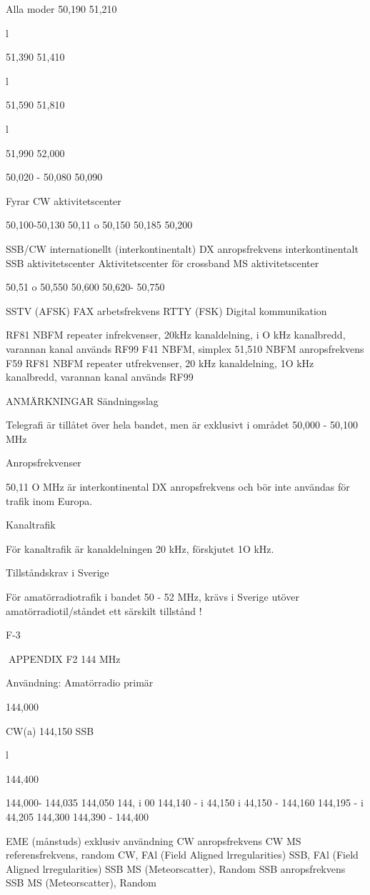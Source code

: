 \documentclass[a4paper,twoside,twocolumn,openright]{book}
\begin{document}
{{{{{{{{{{{Alla moder
50,190
51,210

l

51,390
51,410

l

51,590
51,810

l

51,990
52,000

50,020 - 50,080
50,090

Fyrar
CW aktivitetscenter

50,100-50,130
50,11 o
50,150
50,185
50,200

SSB/CW internationellt (interkontinentalt)
DX anropsfrekvens interkontinentalt
SSB aktivitetscenter
Aktivitetscenter för crossband
MS aktivitetscenter

50,51 o
50,550
50,600
50,620- 50,750

SSTV (AFSK)
FAX arbetsfrekvens
RTTY (FSK)
Digital kommunikation

RF81
NBFM repeater infrekvenser, 20kHz kanaldelning, i O kHz kanalbredd, varannan kanal används
RF99
F41
NBFM, simplex
51,510
NBFM anropsfrekvens
F59
RF81
NBFM repeater utfrekvenser, 20 kHz kanaldelning, 1O kHz kanalbredd, varannan kanal används
RF99

ANMÄRKNINGAR
Sändningsslag

Telegrafi är tillåtet över hela bandet, men är exklusivt i området 50,000 - 50,100 MHz

Anropsfrekvenser

50,11 O MHz är interkontinental DX anropsfrekvens och bör inte användas för trafik inom Europa.

Kanaltrafik

För kanaltrafik är kanaldelningen 20 kHz, förskjutet 1O kHz.

Tillståndskrav i Sverige

För amatörradiotrafik i bandet 50 - 52 MHz, krävs i Sverige utöver amatörradiotil/ståndet ett särskilt tillstånd !

F-3

APPENDIX F2
144 MHz

Användning: Amatörradio primär

144,000

CW(a)
144,150
SSB

l

144,400

144,000- 144,035
144,050
144, i 00
144,140 - i 44,150
i 44,150 - 144,160
144,195 - i 44,205
144,300
144,390 - 144,400

EME (månstuds) exklusiv användning
CW anropsfrekvens
CW MS referensfrekvens, random
CW, FAl (Field Aligned lrregularities)
SSB, FAl (Field Aligned lrregularities)
SSB MS (Meteorscatter), Random
SSB anropsfrekvens
SSB MS (Meteorscatter), Random

}}}}}}}}}}}
\end{document}
